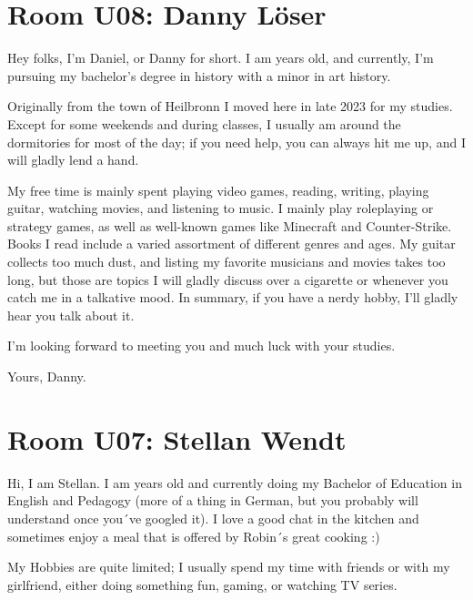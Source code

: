 \section{Room U08: Danny Löser} \label{sec:dannyL}
%
\FPsub\result{\theCurrentDate}{\theBirthdate}
\FPdiv{}
\FPtrunc{}

Hey folks, I'm Daniel, or Danny for short. I am \myage{} years old, and currently, I'm pursuing my bachelor's degree in history with a minor in art history.

Originally from the town of Heilbronn I moved here in late 2023 for my studies. Except for some weekends and during classes, I usually am around the dormitories for most of the day; if you need help, you can always hit me up, and I will gladly lend a hand.

My free time is mainly spent playing video games, reading, writing, playing guitar, watching movies, and listening to music. I mainly play roleplaying or strategy games, as well as well-known games like Minecraft and Counter-Strike. Books I read include a varied assortment of different genres and ages. My guitar collects too much dust, and listing my favorite musicians and movies takes too long, but those are topics I will gladly discuss over a cigarette or whenever you catch me in a talkative mood. In summary, if you have a nerdy hobby, I'll gladly hear you talk about it.

I'm looking forward to meeting you and much luck with your studies.

Yours, Danny.

\section{Room U07: Stellan Wendt} \label{sec:stellanW}
%
\FPsub\result{\theCurrentDate}{\theBirthdate}
\FPdiv{}
\FPtrunc{}

Hi, I am Stellan. I am \myage{} years old and currently doing my Bachelor of Education in English and Pedagogy (more of a thing in German, but you probably will understand once you´ve googled it). I love a good chat in the kitchen and sometimes enjoy a meal that is offered by Robin´s great cooking :)

My Hobbies are quite limited; I usually spend my time with friends or with my girlfriend, either doing something fun, gaming, or watching TV series.

